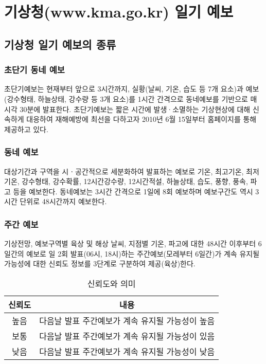 

\chapter{기상청(www.kma.go.kr) 일기 예보}

\section{기상청 일기 예보의 종류}


\subsection{초단기 동네 예보}
초단기예보는 현재부터 앞으로 3시간까지, 실황(날씨, 기온, 습도 등 7개 요소)과 예보(강수형태, 하늘상태, 강수량 등 3개 요소)를 1시간 간격으로 동네예보를 기반으로 매 시각 30분에 발표한다. 초단기예보는 짧은 시간에 발생·소멸하는 기상현상에 대해 신속하게 대응하여 재해예방에 최선을 다하고자 2010년 6월 15일부터 홈페이지를 통해 제공하고 있다.

\subsection{동네 예보}
대상기간과 구역을 시ㆍ공간적으로 세분화하여 발표하는 예보로 기온, 최고기온, 최저기온, 강수형태, 강수확률, 12시간강수량, 12시간적설, 하늘상태, 습도, 풍향, 풍속, 파고 등을 예보한다. 동네예보는 3시간 간격으로 1일에 8회 예보하며 예보구간도 역시 3시간 단위로 48시간까지 예보한다. 

\subsection{주간 예보}
기상전망, 예보구역별 육상 및 해상 날씨, 지점별 기온, 파고에 대한 48시간 이후부터  6일간의 예보로 일 2회 발표(06시, 18시)하는 주간예보(모레부터 6일간)가 계속 유지될 가능성에 대한 신뢰도 정보를 3단계로 구분하여 제공(육상)한다.

\begin{table}[h]
	\center
\begin{tabular}{c|c}
	\hline 
신뢰도  &	내용	  \\ 	\hline 
높음  & 다음날 발표 주간예보가 계속 유지될 가능성이 높음  \\  \hline 
보통 & 다음날 발표 주간예보가 계속 유지될 가능성이 있음  \\ 	\hline 
낮음 & 다음날 발표 주간예보가 계속 유지될 가능성이 낮음   \\ 	\hline 
\end{tabular} 
	\caption{신뢰도와 의미}
\end{table}

